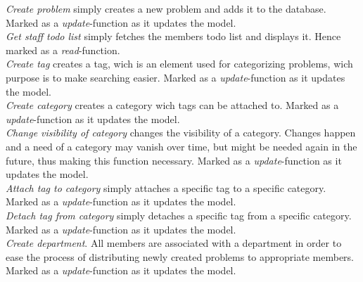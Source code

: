 \emph{Create problem} simply creates a new problem and adds it to the database. Marked as a \textit{update}-function as it updates the model.  \\
\emph{Get staff todo list} simply fetches the \astaff[] members todo list and displays it. Hence marked as a \textit{read}-function. \\
\emph{Create tag} creates a tag, wich is an element used for categorizing problems, wich purpose is to make searching easier. Marked as a \textit{update}-function as it updates the model. \\
\emph{Create category} creates a category wich tags can be attached to. Marked as a \textit{update}-function as it updates the model. \\
\emph{Change visibility of category} changes the visibility of a category. Changes happen and a need of a category may vanish over time, but might be needed again in the future, thus making this function necessary. Marked as a \textit{update}-function as it updates the model. \\
\emph{Attach tag to category} simply attaches a specific tag to a specific category. Marked as a \textit{update}-function as it updates the model. \\
\emph{Detach tag from category} simply detaches a specific tag from a specific category. Marked as a \textit{update}-function as it updates the model. \\
\emph{Create department}. All \astaff[] members are associated with a department in order to ease the process of distributing newly created problems to appropriate \astaff[] members. Marked as a \textit{update}-function as it updates the model. \\
